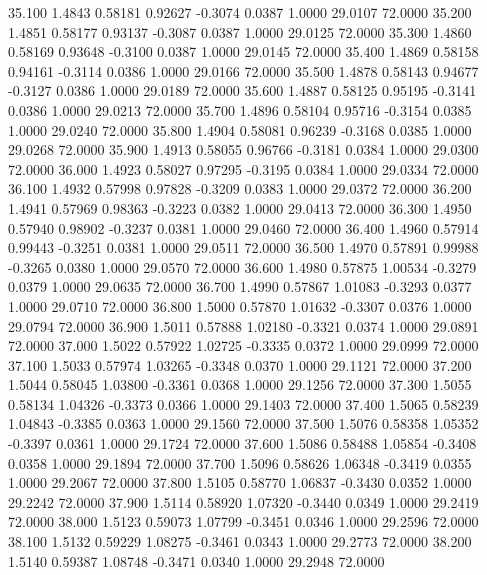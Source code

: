   35.100   1.4843   0.58181   0.92627  -0.3074   0.0387   1.0000  29.0107  72.0000
  35.200   1.4851   0.58177   0.93137  -0.3087   0.0387   1.0000  29.0125  72.0000
  35.300   1.4860   0.58169   0.93648  -0.3100   0.0387   1.0000  29.0145  72.0000
  35.400   1.4869   0.58158   0.94161  -0.3114   0.0386   1.0000  29.0166  72.0000
  35.500   1.4878   0.58143   0.94677  -0.3127   0.0386   1.0000  29.0189  72.0000
  35.600   1.4887   0.58125   0.95195  -0.3141   0.0386   1.0000  29.0213  72.0000
  35.700   1.4896   0.58104   0.95716  -0.3154   0.0385   1.0000  29.0240  72.0000
  35.800   1.4904   0.58081   0.96239  -0.3168   0.0385   1.0000  29.0268  72.0000
  35.900   1.4913   0.58055   0.96766  -0.3181   0.0384   1.0000  29.0300  72.0000
  36.000   1.4923   0.58027   0.97295  -0.3195   0.0384   1.0000  29.0334  72.0000
  36.100   1.4932   0.57998   0.97828  -0.3209   0.0383   1.0000  29.0372  72.0000
  36.200   1.4941   0.57969   0.98363  -0.3223   0.0382   1.0000  29.0413  72.0000
  36.300   1.4950   0.57940   0.98902  -0.3237   0.0381   1.0000  29.0460  72.0000
  36.400   1.4960   0.57914   0.99443  -0.3251   0.0381   1.0000  29.0511  72.0000
  36.500   1.4970   0.57891   0.99988  -0.3265   0.0380   1.0000  29.0570  72.0000
  36.600   1.4980   0.57875   1.00534  -0.3279   0.0379   1.0000  29.0635  72.0000
  36.700   1.4990   0.57867   1.01083  -0.3293   0.0377   1.0000  29.0710  72.0000
  36.800   1.5000   0.57870   1.01632  -0.3307   0.0376   1.0000  29.0794  72.0000
  36.900   1.5011   0.57888   1.02180  -0.3321   0.0374   1.0000  29.0891  72.0000
  37.000   1.5022   0.57922   1.02725  -0.3335   0.0372   1.0000  29.0999  72.0000
  37.100   1.5033   0.57974   1.03265  -0.3348   0.0370   1.0000  29.1121  72.0000
  37.200   1.5044   0.58045   1.03800  -0.3361   0.0368   1.0000  29.1256  72.0000
  37.300   1.5055   0.58134   1.04326  -0.3373   0.0366   1.0000  29.1403  72.0000
  37.400   1.5065   0.58239   1.04843  -0.3385   0.0363   1.0000  29.1560  72.0000
  37.500   1.5076   0.58358   1.05352  -0.3397   0.0361   1.0000  29.1724  72.0000
  37.600   1.5086   0.58488   1.05854  -0.3408   0.0358   1.0000  29.1894  72.0000
  37.700   1.5096   0.58626   1.06348  -0.3419   0.0355   1.0000  29.2067  72.0000
  37.800   1.5105   0.58770   1.06837  -0.3430   0.0352   1.0000  29.2242  72.0000
  37.900   1.5114   0.58920   1.07320  -0.3440   0.0349   1.0000  29.2419  72.0000
  38.000   1.5123   0.59073   1.07799  -0.3451   0.0346   1.0000  29.2596  72.0000
  38.100   1.5132   0.59229   1.08275  -0.3461   0.0343   1.0000  29.2773  72.0000
  38.200   1.5140   0.59387   1.08748  -0.3471   0.0340   1.0000  29.2948  72.0000
